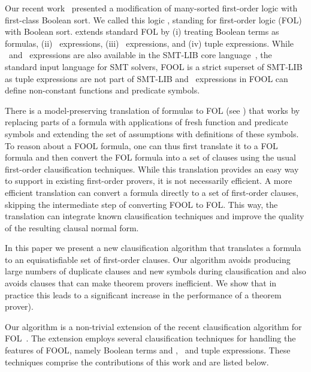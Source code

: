 Our recent work~\cite{FOOL} presented a modification of many-sorted first-order logic with first-class Boolean sort. We called this logic \folb{}, standing for first-order logic (FOL) with Boolean sort. \folb{} extends standard FOL by (i) treating Boolean terms as formulas, (ii) \ITE\ expressions, (iii) \LETIN\ expressions, and (iv) tuple expressions. While \ITE\ and \LETIN\ expressions are also available in the SMT-LIB core language~\cite{BarFT-SMTLIB}, the standard input language for SMT solvers, FOOL is a strict superset of SMT-LIB as tuple expressions are not part of SMT-LIB and \LETIN\ expressions in FOOL can define non-constant functions and predicate symbols. 

There is a model-preserving translation of \folb{} formulas to FOL (see \cite{FOOL})
that works by replacing parts of a \folb{} formula with applications of fresh function and predicate symbols and extending the set of assumptions with definitions of these symbols.
To reason about a FOOL formula, one can thus 
first translate it to a FOL formula and then convert the FOL formula into a set of clauses
using the usual first-order clausification techniques. 
While this translation provides an easy way to support \folb{} in existing first-order provers,
it is not necessarily efficient.
A more efficient translation can convert a \folb{} formula directly to a set of first-order clauses, skipping the intermediate step of converting FOOL to FOL. This way, the translation can integrate known clausification techniques and improve the quality of the resulting clausal normal form. 

In this paper  we present a new clausification algorithm \nfcnf{} that translates a \folb{} formula to an equisatisfiable set of first-order clauses. 
Our algorithm 
avoids producing large numbers  of duplicate clauses and new symbols during clausification and 
also avoids clauses that can make theorem provers inefficient.
We show that in practice this leads to a significant increase in the performance of a theorem prover).

Our \nfcnf{} algorithm  is a non-trivial  extension of the recent \newcnf{} clausification algorithm for FOL~\cite{newcnf_fol}. The extension employs several clausification techniques for handling the features of FOOL, namely Boolean terms and \ITE, \LETIN\ and tuple expressions. These techniques comprise the contributions of this work and are listed below.

